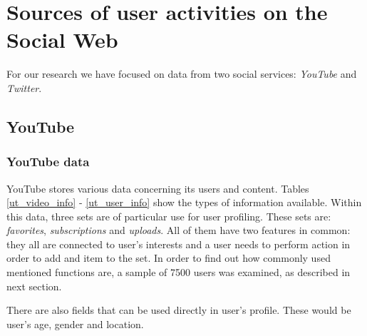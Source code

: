 \section{Sources of user activities on the Social Web}
For our research we have focused on data from two social services: \textit{YouTube} and \textit{Twitter}.
\subsection{YouTube}
\subsubsection{YouTube data}
YouTube stores various data concerning its users and content. Tables
\ref{ut_video_info} - \ref{ut_user_info} show the types of information
available. Within this data, three sets are of particular use for user
profiling. These sets are: \emph{favorites}, \emph{subscriptions} and
\emph{uploads}. All of them have two features in common: they all are connected
to user's interests and a user needs to perform action in order to add and item
to the set. In order to find out how commonly used mentioned functions are, a
sample of 7500 users was examined, as described in next section.

There are also fields that can be used directly in user's profile. These would
be user's age, gender and location.

